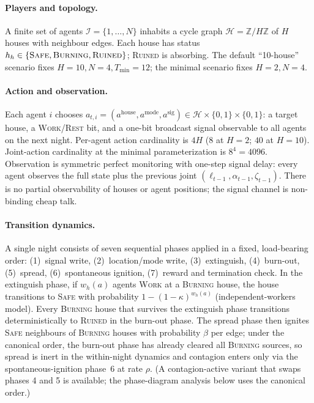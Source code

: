\documentclass{anvil-paper}
\begin{document}
\paragraph{Players and topology.}
A finite set of agents $\mathcal{I}{=}\{1,\ldots,N\}$ inhabits a cycle graph
$\mathcal{H}{=}\mathbb{Z}/H\mathbb{Z}$ of $H$ houses with neighbour edges. Each
house has status $h_h\in\{\textsc{Safe},\textsc{Burning},\textsc{Ruined}\}$;
\textsc{Ruined} is absorbing. The default ``10-house'' scenario fixes
$H{=}10,N{=}4,T_{\min}{=}12$; the minimal scenario fixes $H{=}2,N{=}4$.

\paragraph{Action and observation.}
Each agent $i$ chooses
$a_{t,i}{=}(a^{\text{house}},a^{\text{mode}},a^{\text{sig}})\in
\mathcal{H}\times\{0,1\}\times\{0,1\}$: a target house, a
\textsc{Work}/\textsc{Rest} bit, and a one-bit broadcast signal observable to
all agents on the next night. Per-agent action cardinality is $4H$ ($8$ at
$H{=}2$; $40$ at $H{=}10$). Joint-action cardinality at the minimal
parameterization is $8^4{=}4096$. Observation is symmetric perfect monitoring
with one-step signal delay: every agent observes the full state plus the
previous joint $(\ell_{t-1},\alpha_{t-1},\zeta_{t-1})$. There is no partial
observability of houses or agent positions; the signal channel is
non-binding cheap talk.

\paragraph{Transition dynamics.}
A single night consists of seven sequential phases applied in a fixed,
load-bearing order: (1)~signal write, (2)~location/mode write,
(3)~extinguish, (4)~burn-out, (5)~spread, (6)~spontaneous ignition,
(7)~reward and termination check. In the extinguish phase, if $w_h(a)$
agents \textsc{Work} at a \textsc{Burning} house, the house transitions to
\textsc{Safe} with probability $1-(1-\kappa)^{w_h(a)}$ (independent-workers
model). Every \textsc{Burning} house that survives the extinguish phase
transitions deterministically to \textsc{Ruined} in the burn-out phase. The
spread phase then ignites \textsc{Safe} neighbours of \textsc{Burning}
houses with probability $\beta$ per edge; under the canonical order, the
burn-out phase has already cleared all \textsc{Burning} sources, so spread is
inert in the within-night dynamics and contagion enters only via the
spontaneous-ignition phase~6 at rate $\rho$. (A contagion-active variant
that swaps phases 4 and 5 is available; the phase-diagram analysis below
uses the canonical order.)
\end{document}
